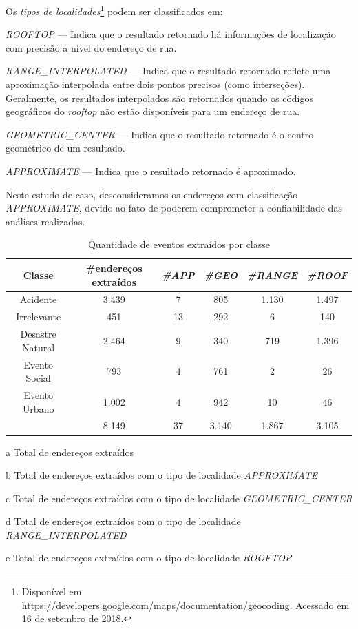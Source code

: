 \documentclass[
	12pt,				%
	oneside,			%
	a4paper,			%
	english,			%
	brazil				%
	]{abntex2ppgsi}
\begin{document}
{{Os \textit{tipos de localidades}\footnote{Disponível em \url{https://developers.google.com/maps/documentation/geocoding}. Acessado em 16 de setembro de 2018.} podem ser classificados em:
\begin{enumerate*}
\item \textit{ROOFTOP} --- Indica que o resultado retornado há informações de localização com precisão a nível do endereço de rua.
\item \textit{RANGE\_INTERPOLATED} --- Indica que o resultado retornado reflete uma aproximação interpolada entre dois pontos precisos (como interseções). Geralmente, os resultados interpolados são retornados quando os códigos geográficos do \textit{rooftop} não estão disponíveis para um endereço de rua.
\item \textit{GEOMETRIC\_CENTER} --- Indica que o resultado retornado é o centro geométrico de um resultado.
\item \textit{APPROXIMATE} --- Indica que o resultado retornado é aproximado.
\end{enumerate*}

Neste estudo de caso, desconsideramos os endereços com classificação \textit{APPROXIMATE}, devido ao fato de poderem comprometer a confiabilidade das análises realizadas. 

\begin{table}[!htb]
\centering
\caption {Quantidade de eventos extraídos por classe}
\label {tab:qtdExtractedAddresses}
\begin{threeparttable}
\begin{tabular}{c|c|c|c|c|c}
\toprule
\textbf{Classe} & \textbf{\#endereços extraídos\tnote{a}} & \textbf{\textit{\#APP\tnote{b}}} & \textbf{\textit{\#GEO\tnote{c}}} & \textbf{\textit{\#RANGE\tnote{d}}} & \textbf{\textit{\#ROOF\tnote{e}}} \\
\midrule
Acidente & 3.439 & 7 & 805 & 1.130 & 1.497 \\
\hline
Irrelevante & 451 & 13 & 292 & 6 & 140 \\
\hline
Desastre Natural & 2.464 & 9 & 340 & 719 & 1.396 \\
\hline
Evento Social & 793 & 4 & 761 & 2 & 26 \\
\hline
Evento Urbano & 1.002 & 4 & 942 & 10 & 46 \\
\midrule
{} & 8.149 & 37 & 3.140 & 1.867 & 3.105 \\
\bottomrule
\end{tabular}
\begin{tablenotes}
\item[a] Total de endereços extraídos
\item[b] Total de endereços extraídos com o tipo de localidade \textit{APPROXIMATE}
\item[c] Total de endereços extraídos com o tipo de localidade \textit{GEOMETRIC\_CENTER}
\item[d] Total de endereços extraídos com o tipo de localidade \textit{RANGE\_INTERPOLATED}
\item[e] Total de endereços extraídos com o tipo de localidade \textit{ROOFTOP}
\end{tablenotes}
\end{threeparttable}
\end{table}


}}
\end{document}
